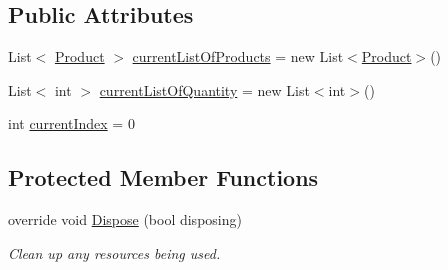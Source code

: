 \subsection*{Public Attributes}
\begin{DoxyCompactItemize}
\item 
List$<$ \hyperlink{class_health___assignment_1_1_product}{Product} $>$ \hyperlink{class_health___assignment_1_1_point_of_sale_form_ae0c22134711d1d912cfb52d0e6bcf7f6}{current\+List\+Of\+Products} = new List$<$\hyperlink{class_health___assignment_1_1_product}{Product}$>$()
\item 
List$<$ int $>$ \hyperlink{class_health___assignment_1_1_point_of_sale_form_a9e033a0bafc206553b3b14fc6997cd6f}{current\+List\+Of\+Quantity} = new List$<$int$>$()
\item 
int \hyperlink{class_health___assignment_1_1_point_of_sale_form_a1cd1623c1bfb5aea3124e368492e74ff}{current\+Index} = 0
\end{DoxyCompactItemize}
\subsection*{Protected Member Functions}
\begin{DoxyCompactItemize}
\item 
override void \hyperlink{class_health___assignment_1_1_point_of_sale_form_a39c2ce31b3d19575392e34ab42fdce32}{Dispose} (bool disposing)
\begin{DoxyCompactList}\small\item\em Clean up any resources being used. \end{DoxyCompactList}\end{DoxyCompactItemize}

